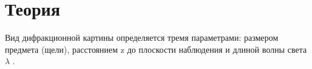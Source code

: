 \documentclass[12pt, a4paper]{report}
\begin{document}
\section{Теория}

Вид дифракционной картины определяется
тремя параметрами: размером предмета (щели), расстоянием z до
плоскости наблюдения и длиной волны света \( \lambda \) .
\end{document}
